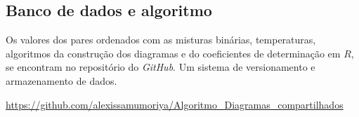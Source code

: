 
\begin{anexosenv}
\partanexos

\chapter{Banco de dados e algoritmo}     %
\label{chap:anexoA}

Os valores dos pares ordenados com as misturas binárias, temperaturas, algoritmos da construção dos diagramas e do coeficientes de determinação em $R$, se encontram no repositório do \textit{GitHub}. Um sistema de versionamento e armazenamento de dados.

\url{https://github.com/alexissamumoriya/Algoritmo_Diagramas_compartilhados}

\end{anexosenv}
